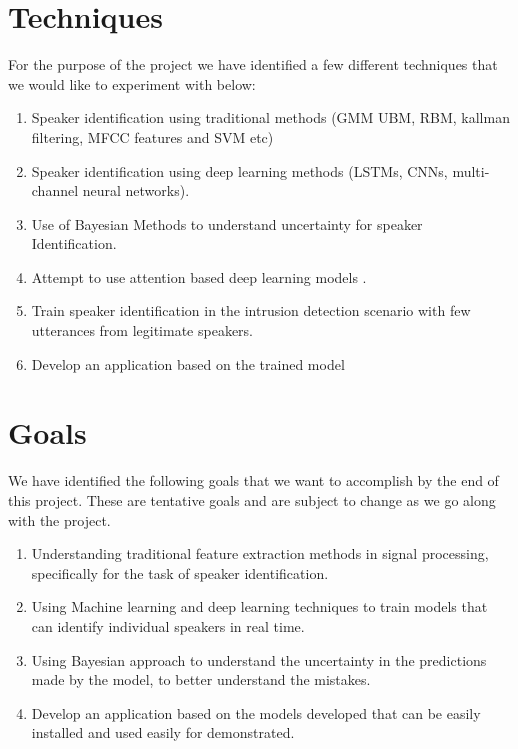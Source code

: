 \documentclass[letterpaper]{article}
\begin{document}
\section{Techniques}
For the purpose of the project we have identified a few different techniques that we would like to experiment with below:
\begin{enumerate}
	\item Speaker identification using traditional methods (GMM UBM, RBM, kallman filtering, MFCC features and SVM etc)
	
	\item Speaker identification using deep learning methods (LSTMs, CNNs, multi-channel neural networks).
	
	\item Use of Bayesian Methods to understand uncertainty for speaker Identification.
	
	\item Attempt to use attention based deep learning models .
	
	\item Train speaker identification in the intrusion detection scenario with few utterances from legitimate speakers.
	
	\item Develop an application based on the trained model
	
\end{enumerate}
\section{Goals}
We have identified the following goals that we want to accomplish by the end of this project. These are tentative goals and are subject to change as we go along with the project.
\begin{enumerate}
	\item Understanding traditional feature extraction methods in signal processing, specifically for the task of speaker identification.
	
	\item Using Machine learning and deep learning techniques to train models that can identify individual speakers in real time.
	
	\item Using Bayesian approach to understand the uncertainty in the predictions made by the model, to better understand the mistakes.
	
	\item Develop an application based on the models developed that can be easily installed and used easily for demonstrated.
\end{enumerate}
\end{document}
